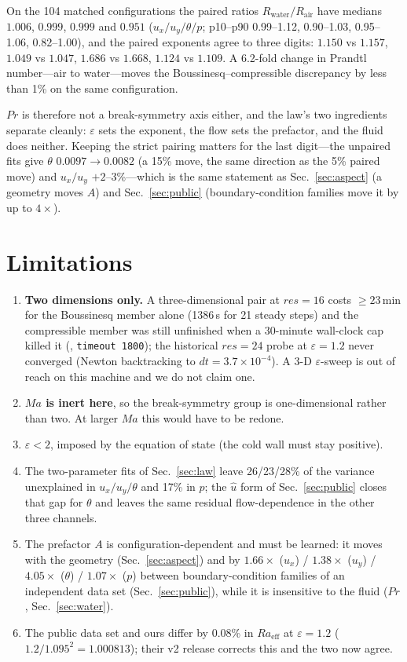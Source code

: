 \documentclass[11pt,a4paper]{article}
\begin{document}
On the 104 matched configurations the paired ratios $R_{\mathrm{water}}/R_{\mathrm{air}}$ have
medians $\mathbf{1.006}$, $\mathbf{0.999}$, $\mathbf{0.999}$ and $\mathbf{0.951}$ ($u_x/u_y/\theta/p$; p10--p90
0.99--1.12, 0.90--1.03, 0.95--1.06, 0.82--1.00), and the paired exponents agree to three digits:
$1.150$ vs $1.157$, $1.049$ vs $1.047$, $1.686$ vs $1.668$, $1.124$ vs $1.109$. A 6.2-fold change
in Prandtl number---air to water---moves the Boussinesq--compressible discrepancy by less than 1\%
on the same configuration.

$Pr$ is therefore not a break-symmetry axis either, and the law's two ingredients separate cleanly:
$\varepsilon$ sets the exponent, the flow sets the prefactor, and the fluid does neither. Keeping
the strict pairing matters for the last digit---the unpaired fits give $\theta$ $0.0097\to0.0082$
(a 15\% move, the same direction as the 5\% paired move) and $u_x/u_y$ $+2$--3\%---which is the same
statement as Sec.~\ref{sec:aspect} (a geometry moves $A$) and Sec.~\ref{sec:public}
(boundary-condition families move it by up to $4\times$).
\section{Limitations}
\label{sec:limits}

\begin{enumerate}
\item \textbf{Two dimensions only.} A three-dimensional pair at $res=16$ costs $\ge23$\,min for the
Boussinesq member alone (1386\,s for 21 steady steps) and the compressible member was still
unfinished when a 30-minute wall-clock cap killed it (,
\texttt{timeout 1800}); the historical $res=24$ probe at $\varepsilon=1.2$ never converged (Newton
backtracking to $dt=3.7\times10^{-4}$). A 3-D $\varepsilon$-sweep is out of reach on this machine
and we do not claim one.
\item \textbf{$Ma$ is inert here}, so the break-symmetry group is one-dimensional rather than two.
At larger $Ma$ this would have to be redone.
\item $\varepsilon<2$, imposed by the equation of state (the cold wall must stay positive).
\item The two-parameter fits of Sec.~\ref{sec:law} leave 26/23/28\% of the variance unexplained in
$u_x/u_y/\theta$ and 17\% in $p$; the $\hat u$ form of Sec.~\ref{sec:public} closes that gap for
$\theta$ and leaves the same residual flow-dependence in the other three channels.
\item The prefactor $A$ is configuration-dependent and must be learned: it moves with the geometry
(Sec.~\ref{sec:aspect}) and by $1.66\times$ ($u_x$) / $1.38\times$ ($u_y$) / $4.05\times$
($\theta$) / $1.07\times$ ($p$) between boundary-condition families of an independent data set
(Sec.~\ref{sec:public}), while it is insensitive to the fluid ($Pr$, Sec.~\ref{sec:water}).
\item The public data set and ours differ by 0.08\% in $Ra_{\mathrm{eff}}$ at $\varepsilon=1.2$
($1.2/1.095^2=1.000813$); their v2 release corrects this and the two now agree.
\end{enumerate}
\end{document}
